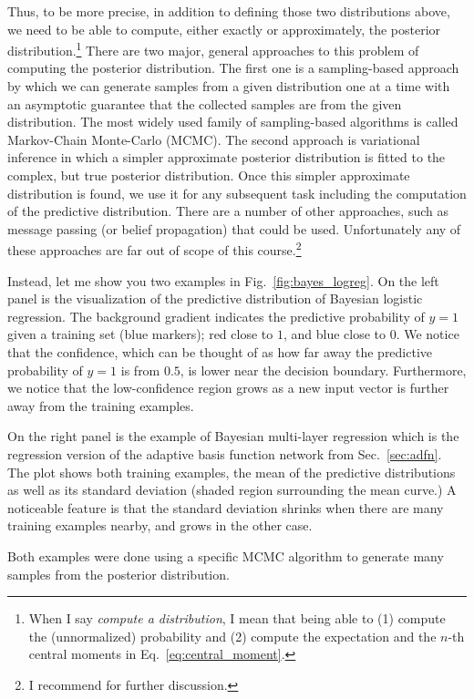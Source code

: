 \documentclass{report}
\begin{document}
Thus, to be more precise, in addition to defining those two distributions above,
we need to be able to compute, either exactly or approximately, the posterior
distribution.\footnote{
    When I say {\it compute a distribution}, I mean that being able to (1)
    compute the (unnormalized) probability and (2) compute the expectation and
    the $n$-th central moments in Eq.~\eqref{eq:central_moment}.
} There are two major, general approaches to this problem of computing the
posterior distribution. The first one is a sampling-based approach by which we
can generate samples from a given distribution one at a time with an asymptotic
guarantee that the collected samples are from the given distribution. The most
widely used family of sampling-based algorithms is called Markov-Chain
Monte-Carlo (MCMC). The second approach is variational inference in which a
simpler approximate posterior distribution is fitted to the complex, but true
posterior distribution. Once this simpler approximate distribution is found, we
use it for any subsequent task including the computation of the predictive
distribution. There are a number of other approaches, such as message passing
(or belief propagation) that could be used. Unfortunately any of these
approaches are far out of scope of this course.\footnote{
    I recommend \cite{bishop2006pattern} for further discussion.
}

Instead, let me show you two examples in Fig.~\ref{fig:bayes_logreg}. On the
left panel is the visualization of the predictive distribution of Bayesian
logistic regression. The background gradient indicates the predictive
probability of $y=1$ given a training set (blue markers); red close to $1$, and
blue close to $0$. We notice that the confidence, which can be thought of as how
far away the predictive probability of $y=1$ is from $0.5$, is lower near the
decision boundary. Furthermore, we notice that the low-confidence region grows
as a new input vector is further away from the training examples.

On the right panel is the example of Bayesian multi-layer regression which is
the regression version of the adaptive basis function network from
Sec.~\ref{sec:adfn}. The plot shows both training examples, the mean of the
predictive distributions as well as its standard deviation (shaded region
surrounding the mean curve.) A noticeable feature is that the standard deviation
shrinks when there are many training examples nearby, and grows in the other
case. 

Both examples were done using a specific MCMC algorithm to generate many samples
from the posterior distribution.
\end{document}
